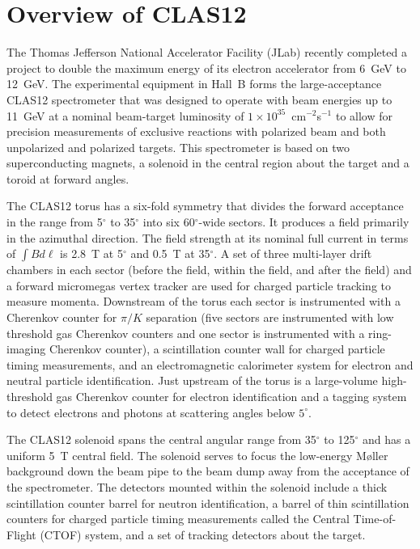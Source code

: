 \documentclass{elsart}
\begin{document}

\newpage
\section{Overview of CLAS12}

The Thomas Jefferson National Accelerator Facility (JLab) recently completed a project to 
double the maximum energy of its electron accelerator from 6~GeV to 12~GeV. The experimental 
equipment in Hall~B forms the large-acceptance CLAS12 spectrometer that was designed to operate 
with beam energies up to 11~GeV at a nominal beam-target luminosity of 
$1 \times 10^{35}$~cm$^{-2}$s$^{-1}$ to allow for precision measurements of exclusive 
reactions with polarized beam and both unpolarized and polarized targets. This spectrometer is 
based on two superconducting magnets, a solenoid in the central region about the target and a 
toroid at forward angles.

The CLAS12 torus has a six-fold symmetry that divides the forward acceptance in the range from
5$^\circ$ to 35$^\circ$ into six 60$^\circ$-wide sectors. It produces a field primarily in the 
azimuthal direction. The field strength at its nominal full current in terms of 
$\int \!B d\ell$ is 2.8~T at 5$^\circ$ and 0.5~T at 35$^\circ$. A set of three multi-layer drift 
chambers in each sector (before the field, within the field, and after the field) and a forward
micromegas vertex tracker are used for charged particle tracking to measure momenta. Downstream 
of the torus each sector is instrumented with a Cherenkov counter for $\pi/K$ separation (five 
sectors are instrumented with low threshold gas Cherenkov counters and one sector is instrumented 
with a ring-imaging Cherenkov counter), a scintillation counter wall for charged particle 
timing measurements, and an electromagnetic calorimeter system for electron and neutral particle 
identification. Just upstream of the torus is a large-volume high-threshold gas Cherenkov counter 
for electron identification and a tagging system to detect electrons and photons at scattering 
angles below $5^\circ$.

The CLAS12 solenoid spans the central angular range from 35$^\circ$ to 125$^\circ$ and has a 
uniform 5~T central field. The solenoid serves to focus the low-energy M{\o}ller background down 
the beam pipe to the beam dump away from the acceptance of the spectrometer. The detectors
mounted within the solenoid include a thick scintillation counter barrel for neutron identification, a
barrel of thin scintillation counters for charged particle timing measurements called the Central 
Time-of-Flight (CTOF) system, and a set of tracking detectors about the target.
\end{document}
